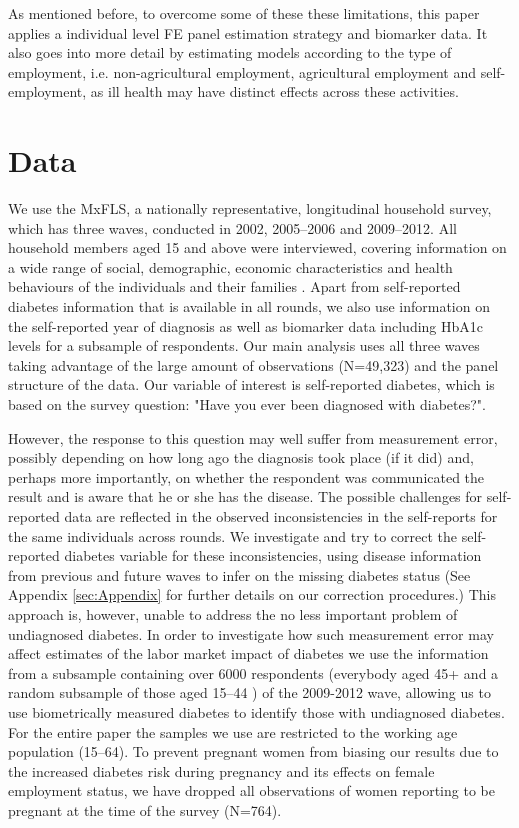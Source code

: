 \documentclass[12pt,english,british]{article}
\begin{document}
As mentioned before, to overcome some of these these limitations, this paper applies a individual level \ac{FE} panel estimation strategy and biomarker data. It also goes into more detail by estimating models according to the type of employment, i.e. non-agricultural employment, agricultural employment and self-employment, as ill health may have distinct effects across these activities.




\section{\label{sec:Data}Data}

We use the \acf{MxFLS}, a nationally representative, longitudinal household survey, which has three
waves, conducted in 2002, 2005--2006 and 2009--2012. All household members aged 15 and above were interviewed, covering information on a wide range of social, demographic, economic characteristics and
health behaviours of the individuals and their families
\citep{Rubalcava2013}. Apart from self-reported diabetes information that is available in all rounds, we also use information
on the self-reported year of diagnosis as well as biomarker data including \ac{HbA1c} levels for a subsample of respondents.  Our main analysis uses all three waves 
taking advantage of the large amount of observations (N=49,323) and the panel structure
of the data. Our variable of interest is self-reported
diabetes, which is based on the survey question: "Have you
ever been diagnosed with diabetes?". 


However, the response to this question may well suffer from measurement error, possibly depending on how long ago the diagnosis took place (if it did) and, perhaps more importantly, on whether the respondent was communicated the result and is aware that he or she has the disease. The possible challenges for self-reported data are reflected in the observed inconsistencies in the self-reports for the same individuals across rounds. 
We investigate and try to correct the self-reported diabetes variable for these inconsistencies, using disease information from previous and future waves to infer on the missing diabetes status (See Appendix \ref{sec:Appendix} for further details on our correction procedures.)  This approach is, however, unable to address the no less important problem of undiagnosed diabetes. In order to investigate how such measurement error may affect estimates of the labor market impact of diabetes
we use the information from a subsample containing over 6000 respondents (everybody aged 45+  and a random subsample of those aged 15--44 \citep{Crimmins2015}) of the 2009-2012 wave, allowing us to use biometrically measured diabetes to identify those with undiagnosed diabetes. For the entire paper the samples we use are restricted to the working age population (15--64). To prevent pregnant women from biasing our results due to the increased diabetes risk during pregnancy and its effects on female employment status, we have dropped all observations of women reporting to be pregnant at the time of the survey (N=764).
\end{document}
